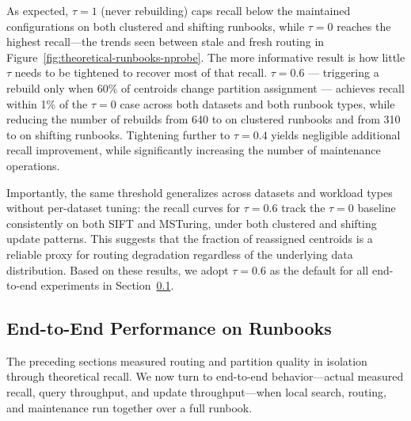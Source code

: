 \documentclass[sigconf,review,anonymous]{acmart}
\newcommand{\dk}[1]{\textcolor{teal}{(DK: #1)}}
\begin{document}
As expected, $\tau = 1$ (never rebuilding) caps recall below the maintained configurations on both clustered and shifting runbooks, while $\tau = 0$ reaches the highest recall---the trends seen between stale and fresh routing in Figure~\ref{fig:theoretical-runbooks-nprobe}. The more informative result is how little $\tau$ needs to be tightened to recover most of that recall. $\tau = 0.6$ — triggering a rebuild only when 60\% of centroids change partition assignment — achieves recall within 1\% of the $\tau=0$ case across both datasets and both runbook types, while reducing the number of rebuilds from 640 to  on clustered runbooks and from 310 to  on shifting runbooks. Tightening further to $\tau=0.4$ yields negligible additional recall improvement, while significantly increasing the number of maintenance operations.

Importantly, the same threshold generalizes across datasets and workload types without per-dataset tuning: the recall curves for $\tau=0.6$ track the $\tau=0$ baseline consistently on both SIFT and MSTuring, under both clustered and shifting update patterns. This suggests that the fraction of reassigned centroids is a reliable proxy for routing degradation regardless of the underlying data distribution. Based on these results, we adopt $\tau=0.6$ as the default for all end-to-end experiments in Section~\ref{sec:eval-perf}.

\subsection{End-to-End Performance on Runbooks}
\label{sec:eval-perf}

The preceding sections measured routing and partition quality in isolation through theoretical recall. We now turn to end-to-end behavior---actual measured recall, query throughput, and update throughput---when local search, routing, and maintenance run together over a full runbook.


\end{document}
